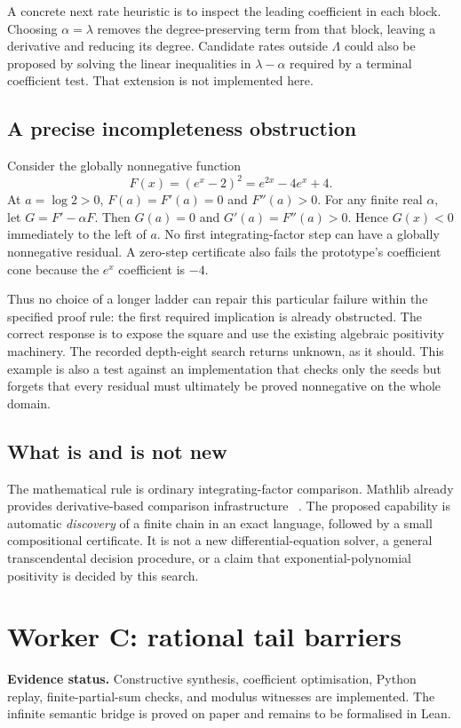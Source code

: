 \documentclass[11pt,a4paper]{article}
\theoremstyle{definition}\newtheorem{definition}[theorem]{Definition}
\newcommand{\Unknown}{\textsf{unknown}}
\newcommand{\status}[1]{\par\noindent\textbf{Evidence status.} #1\par}
\begin{document}
A concrete next rate heuristic is to inspect the leading coefficient in each
block. Choosing $\alpha=\lambda$ removes the degree-preserving term from that
block, leaving a derivative and reducing its degree. Candidate rates outside
$\Lambda$ could also be proposed by solving the linear inequalities in
$\lambda-\alpha$ required by a terminal coefficient test. That extension is
not implemented here.

\subsection{A precise incompleteness obstruction}

Consider the globally nonnegative function
\[
 F(x)=(e^x-2)^2=e^{2x}-4e^x+4.
\]
At $a=\log2>0$, $F(a)=F'(a)=0$ and $F''(a)>0$. For any finite real
$\alpha$, let $G=F'-\alpha F$. Then $G(a)=0$ and $G'(a)=F''(a)>0$.
Hence $G(x)<0$ immediately to the left of $a$. No first integrating-factor
step can have a globally nonnegative residual. A zero-step certificate also
fails the prototype's coefficient cone because the $e^x$ coefficient is $-4$.

Thus no choice of a longer ladder can repair this particular failure within the
specified proof rule: the first required implication is already obstructed.
The correct response is to expose the square and use the existing algebraic
positivity machinery. The recorded depth-eight search returns \Unknown{}, as
it should. This example is also a test against an implementation that checks
only the seeds but forgets that every residual must ultimately be proved
nonnegative on the whole domain.

\subsection{What is and is not new}

The mathematical rule is ordinary integrating-factor comparison. Mathlib
already provides derivative-based comparison infrastructure
~\cite{mathlib-meanvalue}. The proposed capability is automatic \emph{discovery}
of a finite chain in an exact language, followed by a small compositional
certificate. It is not a new differential-equation solver, a general
transcendental decision procedure, or a claim that exponential-polynomial
positivity is decided by this search.

\section{Worker C: rational tail barriers}
\label{sec:tails}
\status{Constructive synthesis, coefficient optimisation, Python replay,
finite-partial-sum checks, and modulus witnesses are implemented. The infinite
semantic bridge is proved on paper and remains to be formalised in Lean.}
\end{document}
